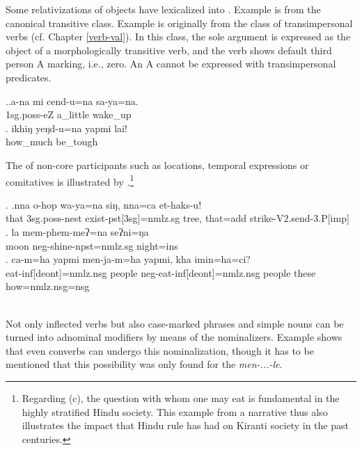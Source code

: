 Some  relativizations of objects have lexicalized into . Example \Next[a] is from the canonical transitive class. Example \Next[b] is originally from the class of transimpersonal verbs (cf. Chapter \ref{verb-val}). In this class, the sole argument is expressed as the object of a morphologically transitive verb, and the verb shows default third person A marking, i.e., zero. An A cannot be expressed with transimpersonal predicates.


\ex.\ag.a-na mi cend-u=na sa-ya=na.\\
{\sc 1sg.poss-}eZ  a\_little wake\_up \\
\bg. ikhiŋ yeŋd-u=na yapmi lai!\\
how\_much be\_tough  \\


The  of non-core participants such as locations, temporal expressions or comitatives is illustrated by \Next.\footnote{Regarding (c), the question with whom one may eat is fundamental in the highly stratified Hindu society. This example from a narrative thus also illustrates the impact that Hindu rule has had on Kiranti society in the past centuries.} 	
 
 
\ex. \ag.nna  o-hop wa-ya=na siŋ, nna=ca  et-haks-u!\\
		that {\sc 3sg.poss}-nest exist-{\sc pst[3sg]=nmlz.sg} tree, that{\sc =add} strike-{\sc V2.send-3.P[imp]}\\
	  
 	\bg. la   mem-phem-meʔ=na   seʔni=ŋa\\
	moon {\sc neg}-shine{\sc -npst=nmlz.sg} night{\sc =ins} 		\\
	 
	\bg. {ca-m}=ha  yapmi  men-ja-m=ha yapmi,  kha   imin=ha=ci?\\
	eat-{\sc inf[deont]=nmlz.nsg} people {\sc neg}-eat-{\sc inf[deont]=nmlz.nsg} people these how{\sc =nmlz.nsg=nsg} 		\\
	\\ 

	
Not only inflected verbs but also case-marked phrases \Next and simple nouns \NNext[a] can be turned into adnominal modifiers by means of the nominalizers. Example \NNext[b] shows that even converbs can undergo this nominalization, though it has to be mentioned that this possibility was only found for the   \emph{men-...-le}.



